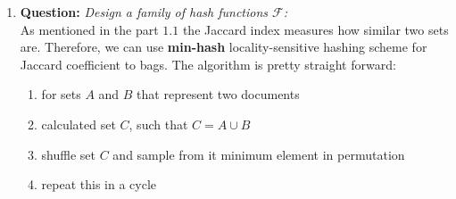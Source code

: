 \documentclass[11pt,a4paper,english]{article}
\begin{document}
\begin{enumerate}
\begin{enumerate}
          \item \textbf{Question:} \textit{Design a family of hash functions $\mathcal{F}$:}\\
            As mentioned in the part $1.1$ the Jaccard index measures how similar two sets are. Therefore, we can use \textbf{min-hash} locality-sensitive hashing scheme for Jaccard coefficient to bags. The algorithm is pretty straight forward:
            \begin{enumerate}
              \item for sets $A$ and $B$ that represent two documents
              \item calculated set $C$, such that $C = A \cup B $
              \item shuffle set $C$ and sample from it minimum element in permutation
              \item repeat this in a cycle
            \end{enumerate}


\end{enumerate}
\end{enumerate}
\end{document}
